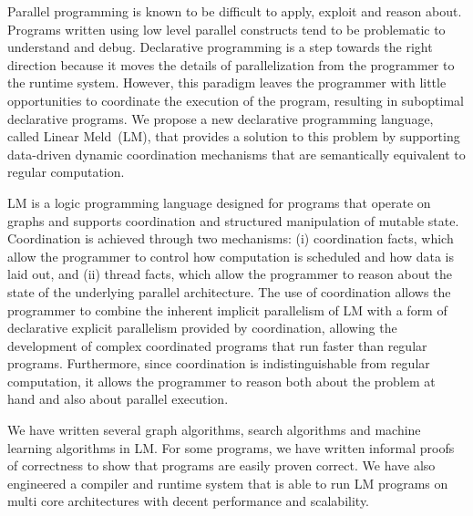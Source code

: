 Parallel programming is known to be difficult to apply, exploit and reason
about. Programs written using low level parallel constructs tend to be
problematic to understand and debug. Declarative programming is a step towards
the right direction because it moves the details of parallelization from the
programmer to the runtime system. However, this paradigm leaves the programmer
with little opportunities to coordinate the execution of the program, resulting
in suboptimal declarative programs.  We propose a new declarative programming
language, called Linear Meld~(LM), that provides a solution to this problem by
supporting data-driven dynamic coordination mechanisms that are semantically
equivalent to regular computation.

LM is a logic programming language designed for programs that operate on graphs
and supports coordination and structured manipulation of mutable state.
Coordination is achieved through two mechanisms: (i) coordination facts, which
allow the programmer to control how computation is scheduled and how data is
laid out, and (ii) thread facts, which allow the programmer to reason about the
state of the underlying parallel architecture.  The use of coordination allows the
programmer to combine the inherent implicit parallelism of LM with a form of
declarative explicit parallelism provided by coordination, allowing the
development of complex coordinated programs that run faster than regular
programs. Furthermore, since coordination is indistinguishable from regular
computation, it allows the programmer to reason both about the problem at hand
and also about parallel execution.

We have written several graph algorithms, search algorithms and machine learning
algorithms in LM. For some programs, we have written informal proofs of
correctness to show that programs are easily proven correct. We have also
engineered a compiler and runtime system that is able to run LM programs on
multi core architectures with decent performance and scalability.
